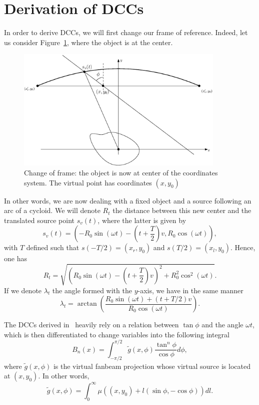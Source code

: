 \documentclass[a4paper]{article}
\numberwithin{equation}{section}
\begin{document}
\section{Derivation of DCCs}

In order to derive DCCs, we will first change our frame of reference. Indeed, let us consider Figure~\ref{fig:change_frame}, where the object is at the center.
\begin{figure}[!ht]
	\centering
	\includegraphics[width=10cm]{frame_object.eps}
	\caption{Change of frame: the object is now at center of the coordinates system. The virtual point has coordinates $\left( x,y_0 \right)$\label{fig:change_frame}}
\end{figure}
In other words, we are now dealing with a fixed object and a source following an arc of a cycloid. We will denote $R_t$ the distance between this new center and the translated source point $s_v(t)$, where the latter is given by
\begin{equation}
	s_v(t) = \left( -R_0 \sin(\omega t) - \left( t + \frac{T}{2} \right)v, R_0 \cos(\omega t) \right),
\end{equation}
with $T$ defined such that $s(-T/2) = \left(x_r,y_0\right) $ and $s(T/2) = \left(x_l,y_0\right)$. Hence, one has
\begin{equation}
R_t = \sqrt{ \left( R_0 \sin(\omega t) - \left( t + \frac{T}{2} \right)v \right)^2 + R_0^2 \cos^2(\omega t) }.	
\end{equation}
If we denote $\lambda_t$ the angle formed with the $y$-axis, we have in the same manner
\begin{equation}
\lambda_t = \arctan \left( \frac{R_0 \sin(\omega t) + \left( t + T/2 \right)v}{R_0 \cos(\omega t)} \right).
\end{equation}

The DCCs derived in~\cite{clackdoyle2015consistency} heavily rely on a relation between $\tan \phi$ and the angle $\omega t$, which is then differentiated to change variables into the following integral
\begin{equation}
	B_n(x) = \int_{-\pi/2}^{\pi/2} \tilde{g}(x,\phi) \frac{\tan^n \phi}{\cos \phi} d\phi,	
	\label{eq:Bn_x_phi}
\end{equation}
where $\tilde{g}(x,\phi)$ is the virtual fanbeam projection whose virtual source is located at $(x,y_0)$. In other words,
\begin{equation}
	\tilde{g}(x,\phi) = \int_0^{\infty} \mu\left( (x,y_0) + l(\sin \phi, -\cos \phi) \right) dl.
\end{equation}
\end{document}
